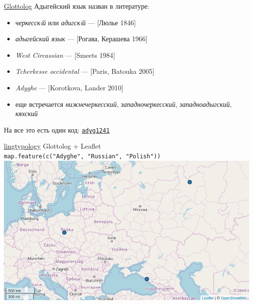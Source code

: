\documentclass[13pt, t]{beamer}
\begin{document}
\begin{frame}{\href{https://glottolog.org/}{Glottolog}}
\alert{\large Адыгейский язык назван в литературе:}
\begin{itemize}
\item \textit{черкесскiй} или \textit{адигскiй} --- [Люлье 1846]
\item \textit{адыгейский язык} --- [Рогава, Керашева 1966]
\item \textit{West Circassian} --- [Smeets 1984]
\item \textit{Tcherkesse occidental} --- [Paris, Batouka 2005]
\item \textit{Adyghe} --- [Korotkova, Lander 2010]
\item еще встречается \textit{нижнечеркесский}, \textit{западночеркесский}, \textit{западноадыгский}, \textit{кяхский} \pause
\end{itemize}
\vfill
\alert{\large На все это есть один код: \href{https://glottolog.org/resource/languoid/id/adyg1241}{\texttt{adyg1241}}}
\end{frame}

\begin{frame}{\href{https://ropensci.github.io/lingtypology/}{lingtypology}}
\alert{\large Glottolog + Leaflet}\\
\vfill
\texttt{\small map.feature(c("Adyghe"{}, "Russian"{}, "Polish"))}\\
\includegraphics[width=\linewidth]{images/01-map}
\end{frame}
\end{document}
